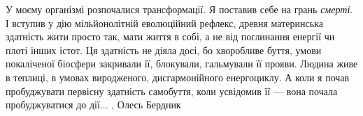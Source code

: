 У моєму організмі розпочалися трансформації. Я поставив себе на грань \emph{смерті}. І
вступив у дію мільйонолітній еволюційний рефлекс, древня материнська здатність
жити просто так, мати життя в собі, а не від поглинання енергії чи плоті інших
істот. Ця здатність не діяла досі, бо хворобливе буття, умови покаліченої
біосфери закривали її, блокували, гальмували її прояви. Людина живе в теплиці,
в умовах виродженого, дисгармонійного енергоциклу. А коли я почав пробуджувати
первісну здатність самобуття, коли усвідомив її — вона почала пробуджуватися до
дії...
, Олесь Бердник
